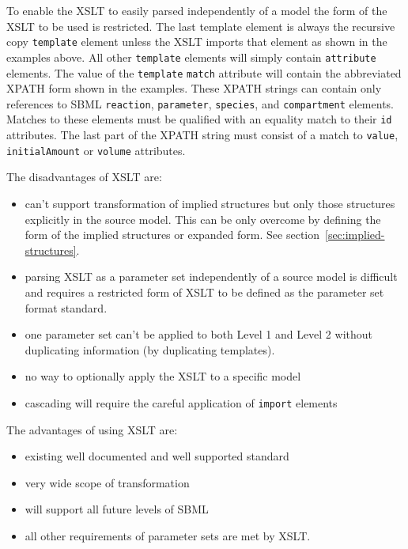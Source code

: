 \documentclass[10pt,twocolumntoc]{cekarticle}
\begin{document}
To enable the XSLT to easily parsed independently of a model the form of the XSLT to be used
is restricted.  The last template element is always the recursive copy \texttt{template}
element unless the XSLT imports that element as shown in the examples above.  All other
\texttt{template} elements will simply contain \texttt{attribute} elements.  The value
of the \texttt{template} \texttt{match} attribute will contain the abbreviated XPATH form
shown in the examples.  These XPATH strings can contain only references to SBML \texttt{reaction},
\texttt{parameter}, \texttt{species}, and \texttt{compartment} elements.  Matches to these elements
must be qualified with an equality match to their \texttt{id} attributes.  The last part of the XPATH
string must consist of a match to \texttt{value}, \texttt{initialAmount} or \texttt{volume} attributes.

The disadvantages of XSLT are:
\begin{itemize}

\item can't support transformation of implied structures but only those structures
explicitly in the source model.  This can be only overcome by defining the form of the
implied structures or expanded form.  See section~\ref{sec:implied-structures}.

\item parsing XSLT as a parameter set
independently of a source model is difficult and requires a restricted form of
XSLT to be defined as the parameter set format standard.  

\item one parameter set can't be applied to both Level 1 and Level 2 without duplicating
information (by duplicating templates).

\item no way to optionally apply the XSLT to a specific model

\item cascading will require the careful application of \texttt{import} elements

\end{itemize}

The advantages of using XSLT are:
\begin{itemize}
\item existing well documented and well supported standard
\item very wide scope of transformation
\item will support all future levels of SBML
\item all other requirements of parameter sets are met by XSLT.
\end{itemize}
\end{document}
